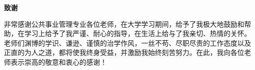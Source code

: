 
\begin{center}
\bf{} 致\hspace{2em}谢
\end{center}


非常感谢公共事业管理专业各位老师，在大学学习期间，给予了我极大地鼓励和帮助，在学习上给予了我严谨、耐心的指导，在生活上给与了我亲切、热情的关怀。老师们渊博的学识、谦逊、谨慎的治学作风，一丝不苟、尽职尽责的工作态度以及正直的为人之道，都将使我终身受益，并激励我始终刻苦努力。在此，我向各位老师表示崇高的敬意和衷心的感谢！
